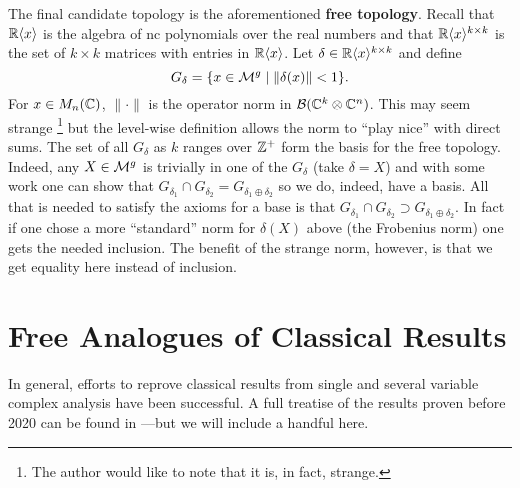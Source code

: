 The final candidate topology is the aforementioned \textbf{free topology}.
Recall that \(\mathbb{R} \langle x \rangle \) is the algebra of nc polynomials over the
real numbers and that
\(\mathbb{R} \langle x \rangle ^{k\times k}\) is the set of \(k \times k\) matrices
with entries in \(\mathbb{R} \langle x \rangle \). Let
\(\delta \in \mathbb{R} \langle x \rangle ^{k\times k}\) and define
\[
  G_\delta = \{x \in \mathcal{M}^{g} \mid \| \delta(x) \| <1\}.
\]
For \(x \in M_n(\mathbb{C})\), \(\|\cdot \|\) is the operator norm in
\(\mathcal{B}(\mathbb{C}^k\otimes\mathbb{C}^n)\). This may seem strange
\footnote{The author would like to note that it is, in fact, strange.}
but the level-wise definition allows the norm to ``play nice'' with direct sums.
The set of all \(G_\delta\) as \(k\) ranges over \(\mathbb{Z} ^+\) form the basis for
the free topology. Indeed, any \(X \in \mathcal{M}^{g} \) is trivially in one of the
\(G_\delta\) (take \(\delta=X\)) and with some work one can show that
\(G_{\delta_1} \cap G_{\delta_2}= G_{\delta_1\oplus \delta_2}\) so we do,
indeed, have a basis. All that is needed to satisfy the axioms for a base is that
\(G_{\delta_1} \cap G_{\delta_2} \supset G_{\delta_1\oplus \delta_2}\). In
fact if one chose a more ``standard'' norm for \(\delta(X)\) above (\eg the
Frobenius norm) one gets the needed inclusion. The benefit of the strange norm,
however, is that we get equality here instead of inclusion.

\section{Free Analogues of Classical Results}%
\label{sec:freeanal}

In general, efforts to reprove classical results from single and several variable
complex analysis have been successful. A full treatise of the results proven
before 2020 can be found in \cite{aglerOperator2019}---but we will include a
handful here.

